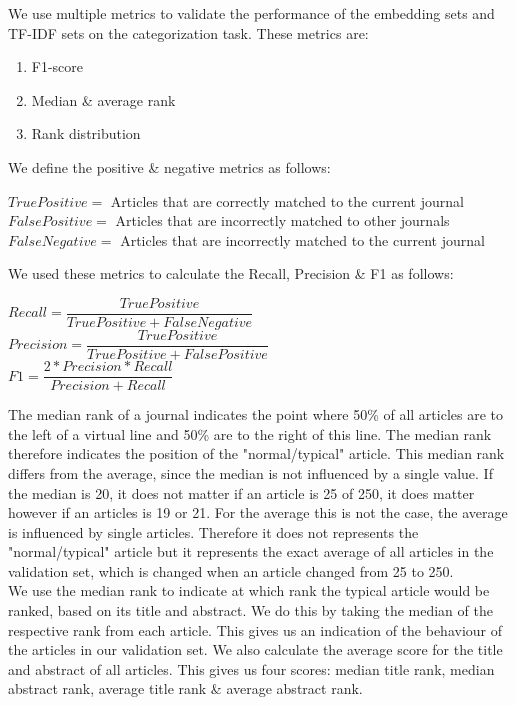 \documentclass[../../Thesis.tex]{subfiles}
\begin{document}
\clearpage
{}
We use multiple metrics to validate the performance of the embedding sets and TF-IDF sets on the categorization task. These metrics are:
\begin{enumerate}
\item{F1-score}
\item{Median \& average rank}
\item{Rank distribution}
\end{enumerate}
We define the positive \& negative metrics as follows:\\
\begin{jumpin}
$True Positive = $ Articles that are correctly matched to the current journal\\
$False Positive = $ Articles that are incorrectly matched to other journals\\
$False Negative = $ Articles that are incorrectly matched to the current journal\\
\end{jumpin}
We used these metrics to calculate the Recall, Precision \& F1 as follows:\\
\begin{jumpin}
$Recall = \dfrac{True Positive}{True Positive + False Negative}$\vspace{0.1in}\\
$Precision = \dfrac{True Positive}{True Positive + False Positive}$\vspace{0.1in}\\
$F1 = \dfrac{2 * Precision * Recall}{Precision + Recall}$
\end{jumpin}
The median rank of a journal indicates the point where 50\% of all articles are to the left of a virtual line and 50\% are to the right of this line. The median rank therefore indicates the position of the "normal/typical"  article. This median rank differs from the average, since the median is not influenced by a single value. If the median is 20, it does not matter if an article is 25 of 250, it does matter however if an articles is 19 or 21. For the average this is not the case, the average is influenced by single articles. Therefore it does not represents the "normal/typical" article but it represents the exact average of all articles in the validation set, which is changed when an article changed from 25 to 250.\\
We use the median rank to indicate at which rank the typical article would be ranked, based on its title and abstract. We do this by taking the median of the respective rank from each article. This gives us an indication of the behaviour of the articles in our validation set. We also calculate the average score for the title and abstract of all articles. This gives us four scores: median title rank, median abstract rank, average title rank \& average abstract rank.\\
\end{document}
